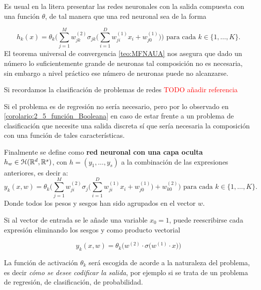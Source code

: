 Es usual en la litera presentar las redes neuronales con la salida compuesta con una función $\theta$, de tal manera que una red neuronal sea de la forma

\begin{equation}
    h_k(x) = \theta_k 
    \biggl( 
        \sum^M_{j=1} w_{jk}^{(2)}
        \sigma_{j k} 
        \biggl(
            \sum_{i=1}^D w_{ji}^{(1)} x_i + w_{j0}^{(1)}
        \biggr)
    \biggr) 
    \text{ para cada  } k \in \{1, \ldots, K \}.
\end{equation}
El teorema universal de convergencia \ref{teo:MFNAUA} nos asegura que dado un número lo suficientemente grande de neuronas tal composición no es necesaria, sin embargo a nivel práctico ese número de neuronas puede no alcanzarse. 

Si recordamos la clasificación de problemas de redes \textcolor{red}{TODO añadir referencia} 

Si el problema es de regresión no sería necesario, pero por lo observado en \ref{corolario:2_5_función_Booleana} en caso de estar frente a un problema de clasificación que necesite una salida discreta sí que sería necesaria la composición con una función de tales características. 


Finalmente se define como \textbf{red neuronal con una capa oculta} $h_w \in \mathcal{H}(\mathbb{R}^d,\mathbb{R}^s)$, con $h=(y_1, \ldots, y_s)$ a la combinación de las expresiones anteriores, es decir a: 
\begin{equation}
    y_k(x,w) = \theta_k 
    \biggl( 
        \sum^M_{j=1} w_{ji}^{(2)}
        \sigma_j 
        \biggl(
            \sum_{i=1}^D w_{ji}^{(1)} x_i + w_{j0}^{(1)}
        \biggr)
        + w_{k0}^{(2)}
    \biggr) 
    \text{ para cada  } k \in \{1, \ldots, K \}.
\end{equation}
Donde todos los pesos y sesgos han sido agrupados en el vector $w$. 

Si al vector de entrada se le añade una variable $x_0 = 1$, puede reescribirse cada expresión eliminando los sesgos y como producto vectorial

\begin{equation}
    y_k(x,w) = \theta_k 
    \bigl(
         w^{(2)} \cdot
        \sigma    
        \bigl(
             w^{(1)} \cdot x 
        \bigr)
    \bigr)
\end{equation}  

La función de activación $\theta_k$ será escogida de acorde a la
naturaleza del problema, es decir \textit{cómo se desee codificar la salida}, por ejemplo si se trata de un problema de regresión, de clasificación, de probabilidad. 
 
